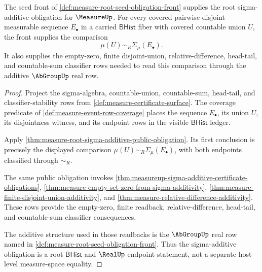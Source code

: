 \begin{theorem}
\label{thm:measure-root-seed-sigma-additive-obligation}
The seed front of \autoref{def:measure-root-seed-obligation-front} supplies
the root sigma-additive obligation for $\MeasureUp$. For every covered
pairwise-disjoint measurable sequence $E_\bullet$ in a carried
$\mathsf{BHist}$ fiber with covered countable union $U$, the front supplies
the comparison
$$
\mu(U)\sim_R\Sigma_\mu(E_\bullet).
$$
It also supplies the empty-zero, finite disjoint-union, relative-difference,
head-tail, and countable-sum classifier rows needed to read this comparison
through the additive $\AbGroupUp$ real row.
\end{theorem}
\begin{proof}
Project the sigma-algebra, countable-union, countable-sum, head-tail, and
classifier-stability rows from \autoref{def:measure-certificate-surface}. The
coverage predicate of \autoref{def:measure-event-row-coverage} places the
sequence $E_\bullet$, its union $U$, its disjointness witness, and its
endpoint rows in the visible $\mathsf{BHist}$ ledger.

Apply \autoref{thm:measure-root-sigma-additive-public-obligation}. Its first
conclusion is precisely the displayed comparison
$\mu(U)\sim_R\Sigma_\mu(E_\bullet)$, with both endpoints classified through
$\sim_R$.

The same public obligation invokes
\autoref{thm:measureup-sigma-additive-certificate-obligations},
\autoref{thm:measure-empty-set-zero-from-sigma-additivity},
\autoref{thm:measure-finite-disjoint-union-additivity}, and
\autoref{thm:measure-relative-difference-additivity}. These rows provide the
empty-zero, finite readback, relative-difference, head-tail, and
countable-sum classifier consequences.

The additive structure used in those readbacks is the $\AbGroupUp$ real row
named in \autoref{def:measure-root-seed-obligation-front}. Thus the
sigma-additive obligation is a root $\mathsf{BHist}$ and $\RealUp$ endpoint
statement, not a separate host-level measure-space equality.
\end{proof}

